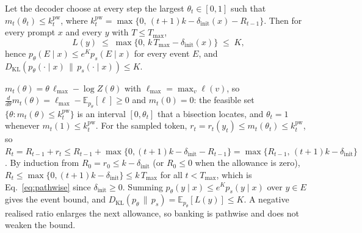 \begin{proposition}\label{prop:pathwise}
Let the decoder choose at every step the largest $\theta_t \in [0,1]$ such that $m_t(\theta_t) \le k^{\mathrm{pw}}_t$, where $k^{\mathrm{pw}}_t = \max\{0,\, (t+1)k - \delta_{\mathrm{init}}(x) - R_{t-1}\}$. Then for every prompt $x$ and every $y$ with $T \le T_{\max}$,
\begin{equation}
L(y) \;\le\; \max\{0,\, k\,T_{\max} - \delta_{\mathrm{init}}(x)\} \;\le\; K,
\label{eq:pathwise}
\end{equation}
hence $p_\theta(E \mid x) \le e^{K} p_s(E \mid x)$ for every event $E$, and $D_{\mathrm{KL}}(p_\theta(\cdot \mid x) \,\|\, p_s(\cdot \mid x)) \le K$.
\end{proposition}
\begin{IEEEproof}
$m_t(\theta) = \theta\,\ell_{\max} - \log Z(\theta)$ with $\ell_{\max} = \max_v \ell(v)$, so $\frac{d}{d\theta} m_t(\theta) = \ell_{\max} - \mathbb{E}_{p_\theta}[\ell] \ge 0$ and $m_t(0) = 0$: the feasible set $\{\theta : m_t(\theta) \le k^{\mathrm{pw}}_t\}$ is an interval $[0, \theta_t]$ that a bisection locates, and $\theta_t = 1$ whenever $m_t(1) \le k^{\mathrm{pw}}_t$. For the sampled token, $r_t = r_t(y_t) \le m_t(\theta_t) \le k^{\mathrm{pw}}_t$, so $R_t = R_{t-1} + r_t \le R_{t-1} + \max\{0, (t+1)k - \delta_{\mathrm{init}} - R_{t-1}\} = \max\{R_{t-1},\, (t+1)k - \delta_{\mathrm{init}}\}$. By induction from $R_0 = r_0 \le k - \delta_{\mathrm{init}}$ (or $R_0 \le 0$ when the allowance is zero), $R_t \le \max\{0, (t+1)k - \delta_{\mathrm{init}}\} \le k\,T_{\max}$ for all $t < T_{\max}$, which is Eq.~\eqref{eq:pathwise} since $\delta_{\mathrm{init}} \ge 0$. Summing $p_\theta(y \mid x) \le e^{K} p_s(y \mid x)$ over $y \in E$ gives the event bound, and $D_{\mathrm{KL}}(p_\theta \,\|\, p_s) = \mathbb{E}_{p_\theta}[L(y)] \le K$. A negative realised ratio enlarges the next allowance, so banking is pathwise and does not weaken the bound.
\end{IEEEproof}

